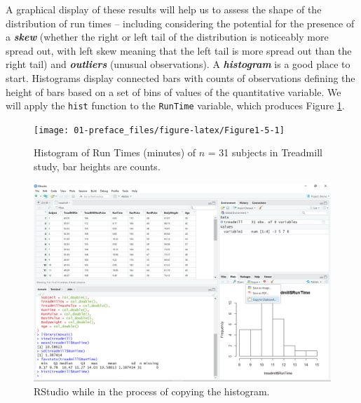 \documentclass[
]{book}
\newenvironment{Shaded}{\begin{snugshade}}{\end{snugshade}}
\newcommand{\FunctionTok}[1]{\textcolor[rgb]{0.00,0.00,0.00}{#1}}
\newcommand{\NormalTok}[1]{#1}
\newcommand{\SpecialCharTok}[1]{\textcolor[rgb]{0.00,0.00,0.00}{#1}}
\begin{document}
\indent A graphical display of these results will help us to assess the shape
of the distribution of run times -- including considering the potential for the presence of a \textbf{\emph{skew}} (whether the right or left tail of the distribution
is noticeably more spread out, with left skew meaning that the left tail
is more spread out than the right tail)  and \textbf{\emph{outliers}} 
(unusual observations). A \textbf{\emph{histogram}}  is a good place to start.
Histograms display connected bars with counts of observations defining
the height of bars based on a set of bins of values of the quantitative variable.
We will apply the \texttt{hist} function to the \texttt{RunTime} variable, which produces
Figure \ref{fig:Figure1-5}.

\begin{Shaded}
\end{Shaded}



\begin{figure}[ht!]

{\centering \texttt{[image: 01-preface\_files/figure-latex/Figure1-5-1]} 

}

\caption{Histogram of Run Times (minutes) of \(n\) = 31 subjects in Treadmill study, bar heights are counts.}\label{fig:Figure1-5}
\end{figure}



\begin{figure}[ht!]

{\centering \includegraphics[width=1\linewidth]{chapter1_files/Fig1-6} 

}

\caption{RStudio while in the process of copying the histogram.}\label{fig:Figure1-6}
\end{figure}
\end{document}
